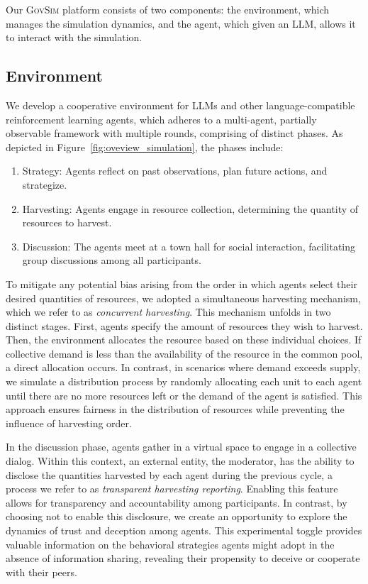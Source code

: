 \documentclass{article}
\newcommand{\envAbbr}{\textsc{GovSim}\xspace}
\begin{document}
Our \envAbbr platform consists of two components: the environment, which manages the simulation dynamics, and the agent, which given an LLM, allows it to interact with the simulation.

\subsection{Environment}

We develop a cooperative environment for LLMs and other language-compatible reinforcement learning agents, which adheres to a multi-agent, partially observable framework with multiple rounds, comprising of distinct phases. As depicted in Figure~\ref{fig:oveview_simulation}, the phases include:
\begin{enumerate}
    \item Strategy: Agents reflect on past observations, plan future actions, and strategize.
    \item Harvesting: Agents engage in resource collection, determining the quantity of resources to harvest.
    \item Discussion: The agents meet at a town hall for social interaction, facilitating group discussions among all participants.
\end{enumerate}


To mitigate any potential bias arising from the order in which agents select their desired quantities of resources, we adopted a simultaneous harvesting mechanism, which we refer to as \textit{concurrent harvesting}. This mechanism unfolds in two distinct stages. First, agents specify the amount of resources they wish to harvest. Then, the environment allocates the resource based on these individual choices. If collective demand is less than the availability of the resource in the common pool, a direct allocation occurs. 
In contrast, in scenarios where demand exceeds supply, we simulate a distribution process by randomly allocating each unit to each agent until there are no more resources left or the demand of the agent is satisfied. This approach ensures fairness in the distribution of resources while preventing the influence of harvesting order.

In the discussion phase, agents gather in a virtual space to engage in a collective dialog. Within this context, an external entity, the moderator, has the ability to disclose the quantities harvested by each agent during the previous cycle, a process we refer to as \textit{transparent harvesting reporting}. Enabling this feature allows for transparency and accountability among participants. In contrast, by choosing not to enable this disclosure, we create an opportunity to explore the dynamics of trust and deception among agents. This experimental toggle provides valuable information on the behavioral strategies agents might adopt in the absence of information sharing, revealing their propensity to deceive or cooperate with their peers.
\end{document}
